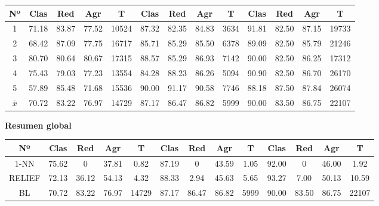 \documentclass[12pt]{article}
\begin{document}
\begin{table}[ht]
\begin{tabular}{ccccc|cccc|cccc}
\textbf{Nº} & \textbf{Clas} & \textbf{Red} & \textbf{Agr} & \textbf{T} & \textbf{Clas} & \textbf{Red} & \textbf{Agr} & \textbf{T} & \textbf{Clas} & \textbf{Red} & \textbf{Agr} & \textbf{T} \\ \hline
1           & 71.18        & 83.87        & 77.52        & 10524    & 87.32         & 82.35        & 84.83        & 3634    & 91.81         & 82.50           & 87.15        & 19733     \\
2           & 68.42            & 87.09        & 77.75        & 16717    & 85.71         & 85.29        & 85.50        & 6378    & 89.09         & 82.50         & 85.79        & 21246    \\
3           & 80.70        & 80.64        & 80.67        & 17315    & 88.57         & 85.29        & 86.93        & 7142    & 90.00         & 82.50         & 86.25        & 17312    \\
4           & 75.43         & 79.03        & 77.23        & 13554    & 84.28         & 88.23        & 86.26        & 5094    & 90.90         & 82.50           & 86.70        & 26170    \\
5           & 57.89            & 85.48        & 71.68        & 15536    & 90.00         & 91.17        & 90.58      & 7746    & 88.18         & 87.50         & 87.84        & 26074    \\ \hline
$\bar{x}$           & 70.72         & 83.22        & 76.97        & 14729    & 87.17         & 86.47        & 86.82        & 5999    & 90.00         & 83.50         & 86.75        & 22107
\end{tabular}
\end{table}


\textbf{Resumen global}

\begin{table}[ht]
\begin{tabular}{ccccc|cccc|cccc}
\textbf{Nº} & \textbf{Clas} & \textbf{Red} & \textbf{Agr} & \textbf{T} & \textbf{Clas} & \textbf{Red} & \textbf{Agr} & \textbf{T} & \textbf{Clas} & \textbf{Red} & \textbf{Agr} & \textbf{T} \\ \hline
1-NN           & 75.62         & 0            & 37.81        & 0.82       & 87.19         & 0            & 43.59       & 1.05       & 92.00        & 0            & 46.00        & 1.92     \\
RELIEF           & 72.13         & 36.12         & 54.13        & 4.32      & 88.33         & 2.94        & 45.63        & 5.65      & 93.27         & 7.00          & 50.13        & 10.59    \\
BL           & 70.72         & 83.22        & 76.97        & 14729    & 87.17         & 86.47        & 86.82        & 5999    & 90.00         & 83.50         & 86.75        & 22107    \\
\end{tabular}
\end{table}
\end{document}
